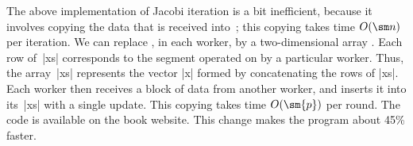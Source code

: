 
The above implementation of Jacobi iteration is a bit inefficient, because it
involves copying the data that is received into~; this copying takes
time $O(\sm n)$ per iteration.  We can replace , in each worker, by a
two-dimensional array .  Each row of~|xs| corresponds to the segment
operated on by a particular worker.  Thus, the array~|xs| represents the
vector |x| formed by concatenating the rows of |xs|.
Each worker then receives a block of data from another worker, and inserts it
into its~|xs| with a single update.  This copying takes time $O(\sm{p})$ per
round.  The code is available on the book website.  This change makes the
program about 45\% faster.
